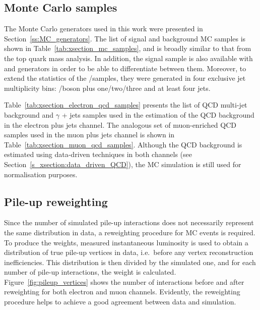 \subsection{Monte Carlo samples}
\label{ss_xsection:MC_samples}
The Monte Carlo generators used in this work were presented in Section~\ref{ss:MC_generators}. The list of signal and
background MC samples is shown in Table~\ref{tab:xsection_mc_samples}, and is broadly similar to that from the top quark
mass analysis. In addition, the signal \ttjets sample is also available with \POWHEG and \MCATNLO generators in order to
be able to differentiate between them. Moreover, to extend the statistics of the \W/\ZpJets samples, they were generated
in four exclusive jet multiplicity bins: \W/\Z boson plus one/two/three and at least four jets.

Table~\ref{tab:xsection_electron_qcd_samples} presents the list of QCD multi-jet background and $\gamma$ + jets samples
used in the estimation of the QCD background in the electron plus jets channel. The analogous set of muon-enriched QCD
samples used in the muon plus jets channel is shown in Table~\ref{tab:xsection_muon_qcd_samples}. Although the QCD
background is estimated using data-driven techniques in both channels (see Section~\ref{s_xsection:data_driven_QCD}),
the MC simulation is still used for normalisation purposes.



\newpage
\subsection{Pile-up reweighting}
\label{sss_xsection:pileup_reweighting}
Since the number of simulated pile-up interactions does not necessarily represent the same distribution in data, a
reweighting procedure for MC events is required. To produce the weights, measured instantaneous luminosity is used to
obtain a distribution of true pile-up vertices in data, i.e.\ before any vertex reconstruction inefficiencies. This
distribution is then divided by the simulated one, and for each number of pile-up interactions, the weight is
calculated. Figure~\ref{fig:pileup_vertices} shows the number of interactions before and after reweighting for both
electron and muon channels. Evidently, the reweighting procedure helps to achieve a good agreement between data and
simulation.

